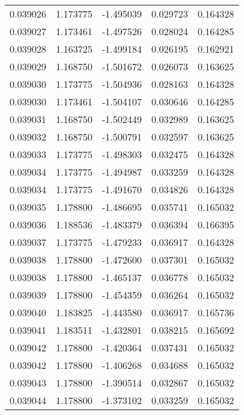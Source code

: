\begin{tabular}{lrrrr}
0.039026    &  1.173775 & -1.495039 &  0.029723 &             0.164328 \\
0.039027    &  1.173461 & -1.497526 &  0.028024 &             0.164285 \\
0.039028    &  1.163725 & -1.499184 &  0.026195 &             0.162921 \\
0.039029    &  1.168750 & -1.501672 &  0.026073 &             0.163625 \\
0.039030    &  1.173775 & -1.504936 &  0.028163 &             0.164328 \\
0.039030    &  1.173461 & -1.504107 &  0.030646 &             0.164285 \\
0.039031    &  1.168750 & -1.502449 &  0.032989 &             0.163625 \\
0.039032    &  1.168750 & -1.500791 &  0.032597 &             0.163625 \\
0.039033    &  1.173775 & -1.498303 &  0.032475 &             0.164328 \\
0.039034    &  1.173775 & -1.494987 &  0.033259 &             0.164328 \\
0.039034    &  1.173775 & -1.491670 &  0.034826 &             0.164328 \\
0.039035    &  1.178800 & -1.486695 &  0.035741 &             0.165032 \\
0.039036    &  1.188536 & -1.483379 &  0.036394 &             0.166395 \\
0.039037    &  1.173775 & -1.479233 &  0.036917 &             0.164328 \\
0.039038    &  1.178800 & -1.472600 &  0.037301 &             0.165032 \\
0.039038    &  1.178800 & -1.465137 &  0.036778 &             0.165032 \\
0.039039    &  1.178800 & -1.454359 &  0.036264 &             0.165032 \\
0.039040    &  1.183825 & -1.443580 &  0.036917 &             0.165736 \\
0.039041    &  1.183511 & -1.432801 &  0.038215 &             0.165692 \\
0.039042    &  1.178800 & -1.420364 &  0.037431 &             0.165032 \\
0.039042    &  1.178800 & -1.406268 &  0.034688 &             0.165032 \\
0.039043    &  1.178800 & -1.390514 &  0.032867 &             0.165032 \\
0.039044    &  1.178800 & -1.373102 &  0.033259 &             0.165032 \\

\end{tabular}
